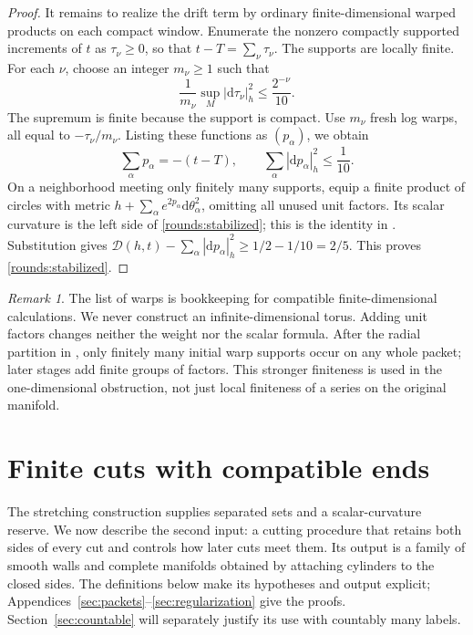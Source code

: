\documentclass[11pt]{article}
\numberwithin{equation}{section}
\theoremstyle{definition}
\theoremstyle{remark}
\newtheorem{remark}[theorem]{Remark}
\begin{document}
\begin{proof}
It remains to realize the drift term by ordinary finite-dimensional
warped products on each compact window. Enumerate the nonzero compactly
supported increments of \(t\) as \(\tau_\nu\ge0\), so that
\(t-T=\sum_\nu\tau_\nu\). The supports are locally finite. For each
\(\nu\), choose an integer \(m_\nu\ge1\) such that
\[
 \frac1{m_\nu}\sup_M|\mathrm d\tau_\nu|_h^2\le\frac{2^{-\nu}}{10}.
\]
The supremum is finite because the support is compact. Use \(m_\nu\)
fresh log warps, all equal to \(-\tau_\nu/m_\nu\). Listing these
functions as \((p_\alpha)\), we obtain
\[
 \sum_\alpha p_\alpha=-(t-T),\qquad
 \sum_\alpha|\mathrm d p_\alpha|_h^2\le\frac1{10}.
\]
On a neighborhood meeting only finitely many supports, equip a finite
product of circles with metric
\(h+\sum_\alpha e^{2p_\alpha}\mathrm d\theta_\alpha^2\), omitting all unused
unit factors. Its scalar curvature is the left side of
\eqref{rounds:stabilized}; this is the identity in . Substitution gives
\(\mathcal D(h,t)-\sum_\alpha|\mathrm d p_\alpha|_h^2\ge1/2-1/10=2/5\).
This proves \eqref{rounds:stabilized}.
\end{proof}

\begin{remark}\label{rounds:no-infinite-torus}
The list of warps is bookkeeping for compatible finite-dimensional
calculations. We never construct an infinite-dimensional torus.
Adding unit factors changes neither the weight nor the scalar formula.
After the radial partition in , only
finitely many initial warp supports occur on any whole packet; later
stages add finite groups of factors. This stronger finiteness is used
in the one-dimensional obstruction, not just local finiteness of a
series on the original manifold.
\end{remark}

\section{Finite cuts with compatible ends}\label{sec:finite-cuts}

The stretching construction supplies separated sets and a scalar-curvature
reserve. We now describe the second input: a cutting procedure that retains
both sides of every cut and controls how later cuts meet them. Its output is
a family of smooth walls and complete manifolds obtained by attaching
cylinders to the closed sides. The definitions below make its hypotheses
and output explicit; Appendices~\ref{sec:packets}--\ref{sec:regularization}
give the proofs. Section~\ref{sec:countable} will separately justify its use
with countably many labels.
\end{document}
